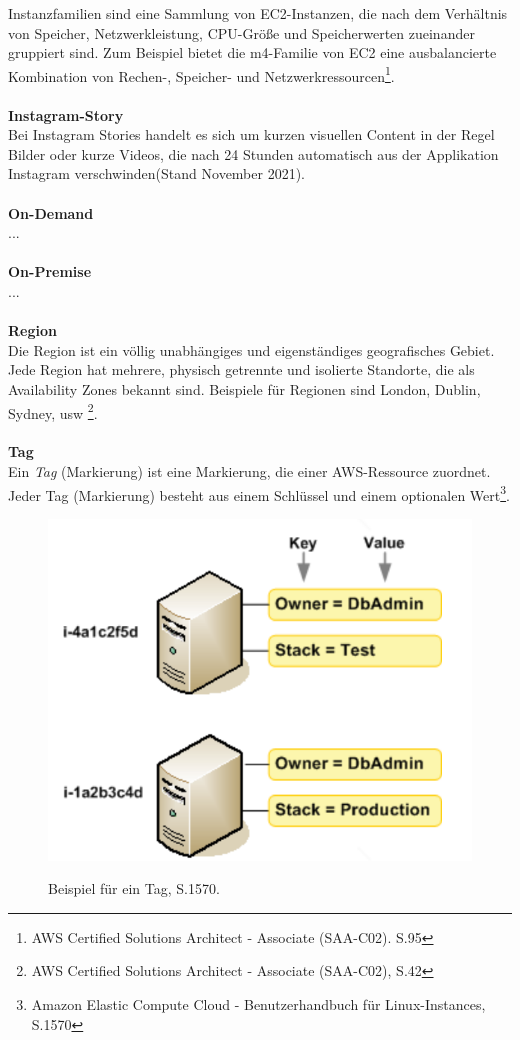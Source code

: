 Instanzfamilien sind eine Sammlung von EC2-Instanzen, die nach dem Verhältnis von Speicher, Netzwerkleistung, CPU-Größe und Speicherwerten zueinander gruppiert sind. Zum Beispiel bietet die m4-Familie von EC2 eine ausbalancierte Kombination von Rechen-, Speicher- und Netzwerkressourcen\footnote{AWS Certified Solutions Architect - Associate (SAA-C02). S.95\cite{AWS1}}.
\\\\
\textbf{Instagram-Story}\\
Bei Instagram Stories handelt es sich um kurzen visuellen Content in der Regel Bilder oder kurze Videos, die nach 24 Stunden automatisch aus der Applikation Instagram verschwinden(Stand November 2021)\cite{IG2}.
\\\\
\textbf{On-Demand}\\
...
\\\\
\textbf{On-Premise}\\
...
\\\\
\textbf{Region}\\
Die Region ist ein völlig unabhängiges und eigenständiges geografisches Gebiet. Jede Region hat mehrere, physisch getrennte und isolierte Standorte, die als Availability Zones bekannt sind. Beispiele für Regionen sind London, Dublin, Sydney, usw \footnote{AWS Certified Solutions Architect - Associate (SAA-C02)\cite{AWS1}, S.42}.
\\\\
\textbf{Tag}\\
Ein \textit{Tag} (Markierung) ist eine Markierung, die einer AWS-Ressource zuordnet. Jeder Tag (Markierung) besteht aus einem Schlüssel und einem optionalen Wert\footnote{Amazon Elastic Compute Cloud - Benutzerhandbuch für Linux-Instances\cite{AMZ26}, S.1570}.
\begin{figure}[h!]
  \centering
  \includegraphics[scale=0.4]{sources/TagExample}
  \caption[Beispiel für ein Tag]{}\label{fig:TagExample}
Beispiel für ein Tag{\cite{AMZ26}, S.1570}.
\end{figure}
